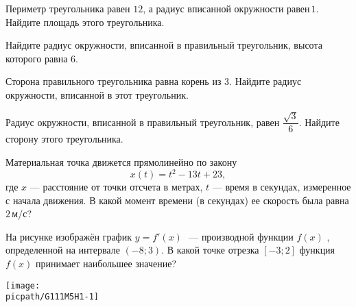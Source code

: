 \begin{class}[number=7]
\begin{listofex}
		\item Периметр треугольника равен \(12\), а радиус вписанной окружности равен \(1\). Найдите площадь этого треугольника.
		\item Найдите радиус окружности, вписанной в правильный треугольник, высота которого равна \(6\).
		\item Сторона правильного треугольника равна  корень из 3. Найдите радиус окружности, вписанной в этот треугольник.
		\item Радиус окружности, вписанной в правильный треугольник, равен \(\dfrac{\sqrt{3}}{6}\).  Найдите сторону этого треугольника.
	\end{listofex}
\end{class}

\begin{homework}[number=1]
	\begin{listofex}
		\item Материальная точка движется прямолинейно по закону 
		\[ x(t) = t^2 - 13t + 23, \]
		где \(x\) --- расстояние от точки отсчета в метрах, \(t\) --- время в секундах, измеренное с начала движения. В какой момент времени (в секундах) ее скорость была равна \(2\) м/с?
		\item
		\begin{minipage}[t]{\bodywidth}
			На рисунке изображён график \(y=f'(x)\)   — производной функции \(f(x)\)  , определенной на интервале \((-8; 3)\). В какой точке отрезка \([-3; 2]\) функция \(f(x)\) принимает наибольшее значение?
		\end{minipage}
		\hspace{0.02\linewidth}
		\begin{minipage}[t]{\picwidth}
			\texttt{[image: \\picpath/G111M5H1-1]}
		\end{minipage}
		\item

\end{listofex}
\end{homework}
